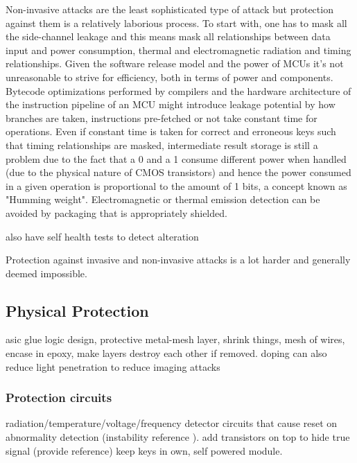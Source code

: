 Non-invasive attacks are the least sophisticated type of attack but protection against them is a relatively laborious process\citep{anderson:cautionary_note}. To start with, one has to mask all the side-channel leakage and this means mask all relationships between data input and power consumption, thermal and electromagnetic radiation and timing relationships\citep{kocher:DPA}\cite{sergei:thesis}. Given the software release model and the power of MCUs it's not unreasonable to strive for efficiency, both in terms of power and components. Bytecode optimizations performed by compilers and the hardware architecture of the instruction pipeline of an MCU might introduce leakage potential \citep{kocher:DPA}\citep{sergei:thesis} by how branches are taken, instructions pre-fetched or not take constant time for operations. Even if constant time is taken for correct and erroneous keys such that timing relationships are masked, intermediate result storage is still a problem due to the fact that a 0 and a 1 consume different power when handled (due to the physical nature of CMOS transistors) and hence the power consumed in a given operation is proportional to the amount of 1 bits, a concept known as "Humming weight"\citep{website:riscure}\citep{kocher:DPA}. Electromagnetic or thermal emission detection can be avoided by packaging that is appropriately shielded.

also have self health tests to detect alteration\citep{anderson:tamper_resistance}

Protection against invasive and non-invasive attacks is a lot harder and generally deemed impossible. 
\subsection{Physical Protection}
asic glue logic design, protective metal-mesh layer, shrink things, mesh of wires, encase in epoxy, make layers destroy each other if removed. doping can also reduce light penetration to reduce imaging attacks 
\subsubsection{Protection circuits}
radiation/temperature/voltage/frequency detector circuits that cause reset on abnormality detection (instability reference \citep{anderson:cautionary_note}). add transistors on top to hide true signal (provide reference)
 keep keys in own, self powered module.
